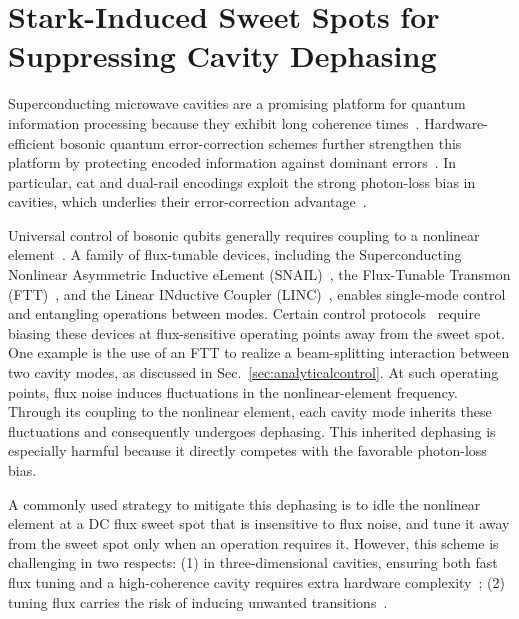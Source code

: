 \chapter{Stark-Induced Sweet Spots for Suppressing Cavity Dephasing}
\label{chap:stark-sweet-spots}

Superconducting microwave cavities are a promising platform for quantum information processing because they exhibit long coherence times~\cite{Milul2023,longcoherence2,Romanenko2020,Reagor2016,longcoherence5}.  Hardware-efficient bosonic quantum error-correction schemes further strengthen this platform by protecting encoded information against dominant errors~\cite{breakeven1,breakeven2,Ni2023,breakeven4,CampagneIbarcq2020,breakeven7,aqec1,aqec2,Cai2021}. In particular, cat and dual-rail encodings exploit the strong photon-loss bias in cavities, which underlies their error-correction advantage~\cite{teoh2023dual,putterman2025hardware}.

Universal control of bosonic qubits generally requires coupling to a nonlinear element~\cite{Ma2021QuantumControl,cavitycontrol1,cavitycontrol2,cavitycontrol3}. A family of flux-tunable devices, including the Superconducting Nonlinear Asymmetric Inductive eLement (SNAIL)~\cite{SNAIL}, the Flux-Tunable Transmon (FTT)~\cite{squid}, and the Linear INductive Coupler (LINC)~\cite{linc}, enables single-mode control and entangling operations between modes. Certain control protocols~\cite{SNAIL,linc,Copetudo2026DirectPhase} require biasing these devices at flux-sensitive operating points away from the sweet spot. One example is the use of an FTT to realize a beam-splitting interaction between two cavity modes, as discussed in Sec.~\ref{sec:analyticalcontrol}. At such operating points, flux noise induces fluctuations in the nonlinear-element frequency. Through its coupling to the nonlinear element, each cavity mode inherits these fluctuations and consequently undergoes dephasing. This inherited dephasing is especially harmful because it directly competes with the favorable photon-loss bias.

A commonly used strategy to mitigate this dephasing is to idle the nonlinear element at a DC flux sweet spot that is insensitive to flux noise, and tune it away from the sweet spot only when an operation requires it. However, this scheme is challenging in two respects: (1) in three-dimensional cavities, ensuring both fast flux tuning and a high-coherence cavity requires extra hardware complexity~\cite{magnetichose1,magnetichose2,li2025,valadares2026}; (2) tuning flux carries the risk of inducing unwanted transitions~\cite{Sung2021CZiSWAPleakage,Yan2018TunableCouplingleakage,Stehlik2021TunableCouplingleakage}.

